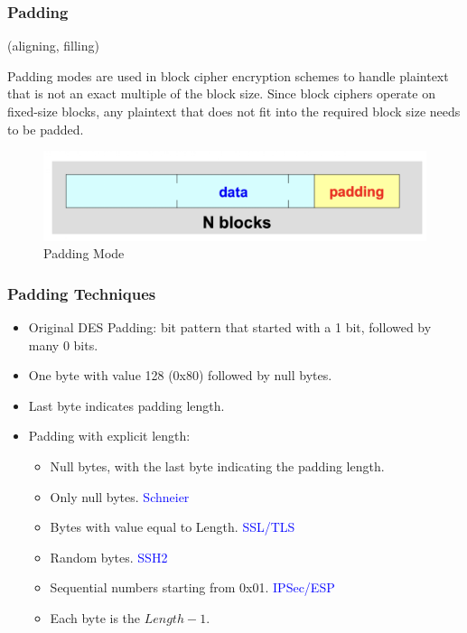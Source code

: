 \subsubsection{Padding}
\begin{center}
    (aligning, filling)
\end{center}

Padding modes are used in block cipher encryption schemes to handle plaintext that is not an exact multiple of the block size. Since block ciphers operate on fixed-size blocks, any plaintext that does not fit into the required block size needs to be padded.
\begin{figure}[H]
    \includegraphics[width=\linewidth]{Images/Cryptography/padding.png}
    \caption{Padding Mode}
    
\end{figure}

\subsubsection*{Padding Techniques}
\begin{itemize}
    \item Original DES Padding: bit pattern that started with a 1 bit, followed by many 0 bits.
    \item One byte with value 128 (0x80) followed by null bytes.
    \item Last byte indicates padding length.
    \item Padding with explicit length:
    \begin{itemize}
        \item Null bytes, with the last byte indicating the padding length.
        \item Only null bytes. \textcolor{Blue}{Schneier}
        \item Bytes with value equal to Length. \textcolor{Blue}{SSL/TLS}
        \item Random bytes. \textcolor{Blue}{SSH2}
        \item Sequential numbers starting from 0x01. \textcolor{Blue}{IPSec/ESP}
        \item Each byte is the $Length-1$.
    \end{itemize}
\end{itemize}

